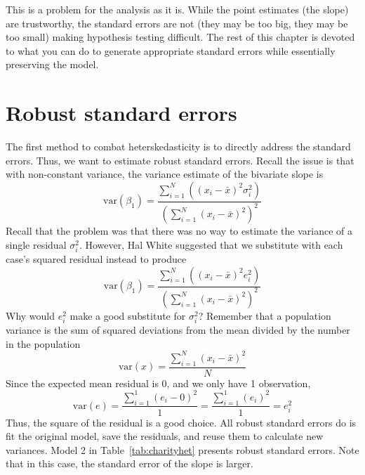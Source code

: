 This is a problem for the analysis as it is. While the point estimates (the slope) are trustworthy, the standard errors are not (they may be too big, they may be too small) making hypothesis testing difficult. The rest of this chapter is devoted to what you can do to generate appropriate standard errors while essentially preserving the model.

\section{Robust standard errors}

The first method to combat heterskedasticity is to directly address the standard errors. Thus, we want to estimate robust standard errors. Recall the issue is that with non-constant variance, the variance estimate of the bivariate slope is
\begin{equation}
\mbox{var}\left(\beta_1\right)=\frac{\sum_{i=1}^N\left(\left(x_i-\bar{x}\right)^2\sigma_i^2\right)}{\left(\sum_{i=1}^N\left(x_i-\bar{x}\right)^2\right)^2}
\end{equation}
Recall that the problem was that there was no way to estimate the variance of a single residual $\sigma_i^2$. However, Hal White suggested that we substitute with each case's squared residual instead to produce
\begin{equation}
\mbox{var}\left(\beta_1\right)=\frac{\sum_{i=1}^N\left(\left(x_i-\bar{x}\right)^2e_i^2\right)}{\left(\sum_{i=1}^N\left(x_i-\bar{x}\right)^2\right)^2}
\end{equation}
Why would $e_i^2$ make a good substitute for $\sigma_i^2$? Remember that a population variance is the sum of squared deviations from the mean divided by the number in the population
\[
\mbox{var}\left(x\right)=\frac{\sum_{i=1}^N\left(x_i-\bar{x}\right)^2}{N}
\]
Since the expected mean residual is 0, and we only have 1 observation,
\[
\mbox{var}\left(e\right)=\frac{\sum_{i=1}^1\left(e_i-0\right)^2}{1}=\frac{\sum_{i=1}^1\left(e_i\right)^2}{1}=e_i^2
\]
Thus, the square of the residual is a good choice. All robust standard errors do is fit the original model, save the residuals, and reuse them to calculate new variances. Model 2 in Table~\ref{tab:charityhet} presents robust standard errors. Note that in this case, the standard error of the slope is larger.

